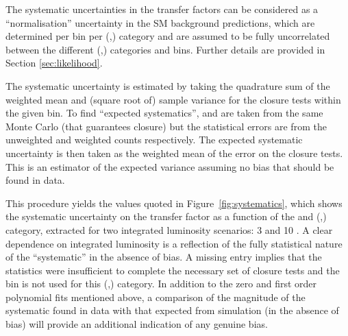 The systematic uncertainties in the transfer factors can be considered
as a ``normalisation'' uncertainty in the SM background predictions,
which are determined per \scalht bin per (\njet,\nb) category and are
assumed to be fully uncorrelated between the different (\njet,\nb)
categories and \scalht bins. Further details are provided in Section
\ref{sec:likelihood}. 

The systematic uncertainty is estimated by taking the quadrature sum
of the weighted mean and (square root of) sample variance for the
closure tests within the given \scalht bin. To find ``expected
systematics'', \nobs and \npre are taken from the same Monte Carlo
(that guarantees closure) but the statistical errors are from the
unweighted and weighted counts respectively. The expected systematic
uncertainty is then taken as the weighted mean of the error on the
closure tests. This is an estimator of the expected variance assuming
no bias that should be found in data. 

This procedure yields the values quoted in
Figure~\ref{fig:systematics}, which shows the systematic uncertainty
on the transfer factor as a function of the \scalht and (\nb,\njet)
category, extracted for two integrated luminosity scenarios: 3 \ifb
and 10 \ifb. A clear dependence on integrated luminosity is a
reflection of the fully statistical nature of the ``systematic'' in
the absence of bias. A missing entry implies that the statistics were
insufficient to complete the necessary set of closure tests and the
\scalht bin is not used for this (\njet,\nb) category. In addition to
the zero and first order polynomial fits mentioned above, a comparison
of the magnitude of the systematic found in data with that expected
from simulation (\ie in the absence of bias) will provide an
additional indication of any genuine bias.

